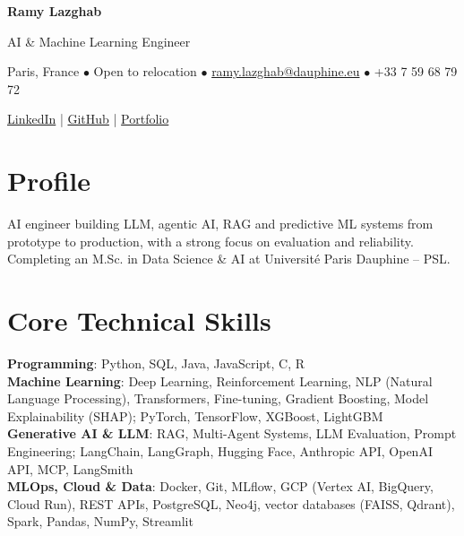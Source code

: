 \documentclass[9.5pt,a4paper]{article}
\newcommand{\cvitem}[2]{\textbf{#1}: #2\\[2pt]}
\begin{document}
\begin{center}
{\Huge\bfseries Ramy Lazghab}

\vspace{1.2mm}
{\large AI \& Machine Learning Engineer}

\vspace{1.2mm}
Paris, France $\bullet$ Open to relocation
\hspace{0.3cm}$\bullet$\hspace{0.3cm}
\href{mailto:ramy.lazghab@dauphine.eu}{ramy.lazghab@dauphine.eu}
\hspace{0.3cm}$\bullet$\hspace{0.3cm}
+33 7 59 68 79 72

\vspace{1.2mm}
\href{https://linkedin.com/in/ramy-lazghab-1464a8201}{LinkedIn}
\hspace{0.3cm}|\hspace{0.3cm}
\href{https://github.com/Rblaze23}{GitHub}
\hspace{0.3cm}|\hspace{0.3cm}
\href{https://rblaze23.github.io/RamyLazghab/}{Portfolio}

\end{center}

\section*{Profile}
AI engineer building LLM, agentic AI, RAG and predictive ML systems from prototype to production, with a strong focus on evaluation and reliability. Completing an M.Sc. in Data Science \& AI at Universit\'e Paris Dauphine -- PSL.

\section*{Core Technical Skills}
\cvitem{Programming}{Python, SQL, Java, JavaScript, C, R}
\cvitem{Machine Learning}{Deep Learning, Reinforcement Learning, NLP (Natural Language Processing), Transformers, Fine-tuning, Gradient Boosting, Model Explainability (SHAP); PyTorch, TensorFlow, XGBoost, LightGBM}
\cvitem{Generative AI \& LLM}{RAG, Multi-Agent Systems, LLM Evaluation, Prompt Engineering; LangChain, LangGraph, Hugging Face, Anthropic API, OpenAI API, MCP, LangSmith}
\cvitem{MLOps, Cloud \& Data}{Docker, Git, MLflow, GCP (Vertex AI, BigQuery, Cloud Run), REST APIs, PostgreSQL, Neo4j, vector databases (FAISS, Qdrant), Spark, Pandas, NumPy, Streamlit}
\end{document}
